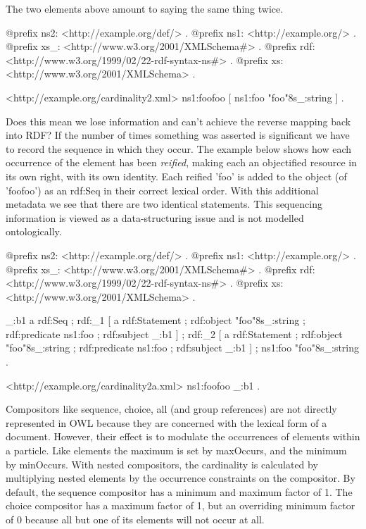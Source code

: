 The two elements above amount to saying the same thing twice.


\begin{DoxyCodeInclude}
@prefix ns2:     <http://example.org/def/> .
@prefix ns1:     <http://example.org/> .
@prefix xs_:     <http://www.w3.org/2001/XMLSchema#> .
@prefix rdf:     <http://www.w3.org/1999/02/22-rdf-syntax-ns#> .
@prefix xs:      <http://www.w3.org/2001/XMLSchema> .

<http://example.org/cardinality2.xml>
      ns1:foofoo
              [ ns1:foo "foo"^^xs_:string
              ] .
\end{DoxyCodeInclude}


Does this mean we lose information and can't achieve the reverse mapping back into RDF? If the number of times something was asserted is significant we have to record the sequence in which they occur. The example below shows how each occurrence of the element has been {\itshape reified\/}, making each an objectified resource in its own right, with its own identity. Each reified 'foo' is added to the object (of 'foofoo') as an rdf:Seq in their correct lexical order. With this additional metadata we see that there are two identical statements. This sequencing information is viewed as a data-\/structuring issue and is not modelled ontologically.


\begin{DoxyCodeInclude}
@prefix ns2:     <http://example.org/def/> .
@prefix ns1:     <http://example.org/> .
@prefix xs_:     <http://www.w3.org/2001/XMLSchema#> .
@prefix rdf:     <http://www.w3.org/1999/02/22-rdf-syntax-ns#> .
@prefix xs:      <http://www.w3.org/2001/XMLSchema> .

_:b1  a       rdf:Seq ;
      rdf:_1  [ a       rdf:Statement ;
                rdf:object "foo"^^xs_:string ;
                rdf:predicate ns1:foo ;
                rdf:subject _:b1
              ] ;
      rdf:_2  [ a       rdf:Statement ;
                rdf:object "foo"^^xs_:string ;
                rdf:predicate ns1:foo ;
                rdf:subject _:b1
              ] ;
      ns1:foo "foo"^^xs_:string .

<http://example.org/cardinality2a.xml>
      ns1:foofoo _:b1 .
\end{DoxyCodeInclude}


Compositors like sequence, choice, all (and group references) are not directly represented in OWL because they are concerned with the lexical form of a document. However, their effect is to modulate the occurrences of elements within a particle. Like elements the maximum is set by maxOccurs, and the minimum by minOccurs. With nested compositors, the cardinality is calculated by multiplying nested elements by the occurrence constraints on the compositor. By default, the sequence compositor has a minimum and maximum factor of 1. The choice compositor has a maximum factor of 1, but an overriding minimum factor of 0 because all but one of its elements will not occur at all.



